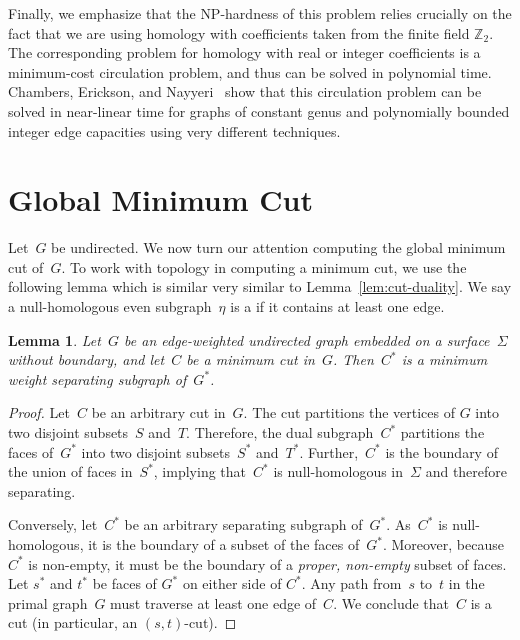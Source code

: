 \documentclass[11pt,twoside]{article}
\def\Z{\mathbb{Z}}
\newtheorem{lemma}[theorem]{Lemma}
\begin{document}
{Finally, we emphasize that the {NP}-hardness of this problem relies crucially on the fact that we are using homology with coefficients taken from the finite field $\Z_2$.  The corresponding problem for homology with real or integer coefficients is a minimum-cost circulation problem, and thus can be solved in polynomial time.
Chambers, Erickson, and Nayyeri~\cite{cen-hfcc-12} show that this circulation problem can be solved in near-linear time for graphs of constant genus and polynomially bounded integer edge capacities using very different techniques.

\section{Global Minimum Cut}
\label{sec:global}

Let~$G$ be undirected. We now turn our attention computing the global minimum cut of~$G$.
To work with topology in computing a minimum cut, we use the following lemma which is similar very similar to Lemma~\ref{lem:cut-duality}.
We say a null-homologous even subgraph~$\eta$ is a  if it contains at least one edge.

\begin{lemma}
\label{lem:mincut-z2}
Let~$G$ be an edge-weighted undirected graph embedded on a surface~$\Sigma$ without boundary, and let~$C$ be a minimum cut in~$G$.
Then~$C^*$ is a minimum weight separating subgraph of~$G^*$.
\end{lemma}

\begin{proof}
  Let~$C$ be an arbitrary cut in~$G$.  The cut partitions the vertices of $G$
  into two disjoint subsets~$S$ and~$T$. Therefore, the dual subgraph~$C^*$
  partitions the faces of~$G^*$ into two disjoint subsets~$S^*$ and~$T^*$.
  Further,~$C^*$ is the boundary of the union of faces in~$S^*$, implying
  that~$C^*$ is null-homologous in~$\Sigma$ and therefore separating.

  Conversely, let~$C^*$ be an arbitrary separating subgraph of~$G^*$.
  As~$C^*$ is null-homologous, it is the boundary of a subset of the faces
  of~$G^*$.  Moreover, because $C^*$ is non-empty, it must be the boundary of
  a \emph{proper, non-empty} subset of faces.  Let $s^*$ and $t^*$ be faces
  of $G^*$ on either side of $C^*$.  Any path from~$s$ to~$t$ in the primal
  graph~$G$ must traverse at least one edge of~$C$.  We conclude that~$C$ is
  a cut (in particular, an $(s,t)$-cut).
\end{proof}

}
\end{document}
